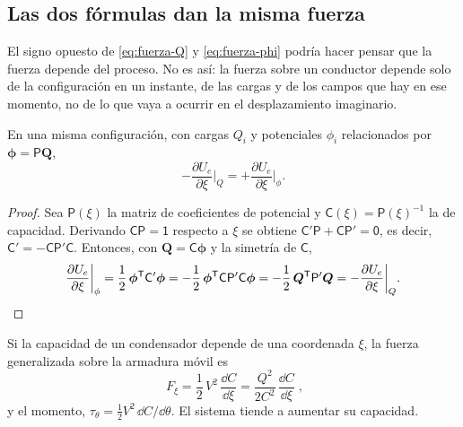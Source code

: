 \subsection{Las dos fórmulas dan la misma fuerza}

El signo opuesto de \eqref{eq:fuerza-Q} y \eqref{eq:fuerza-phi} podría hacer pensar que la fuerza depende del proceso. No es así: la fuerza sobre un
conductor depende solo de la configuración en un instante, de las cargas y de los campos que hay en ese momento, no de lo que vaya a ocurrir en el
desplazamiento imaginario.

\begin{proposicion}\label{prop:equivalencia}
En una misma configuración, con cargas $Q_i$ y potenciales $\phi_i$ relacionados por $\boldsymbol\phi=\mathsf P\boldsymbol Q$,
\begin{equation}\label{eq:equivalencia}
  -\frac{\partial U_e}{\partial\xi}\bigg|_{Q}=+\frac{\partial U_e}{\partial\xi}\bigg|_{\phi} .
\end{equation}
\end{proposicion}

\begin{proof}
Sea $\mathsf P(\xi)$ la matriz de coeficientes de potencial y $\mathsf C(\xi)=\mathsf P(\xi)^{-1}$ la de capacidad. Derivando $\mathsf C\mathsf P=\mathsf 1$ respecto a $\xi$ se obtiene
$\mathsf C'\mathsf P+\mathsf C\mathsf P'=\mathsf 0$, es decir, $\mathsf C'=-\mathsf C\mathsf P'\mathsf C$. Entonces, con $\boldsymbol Q=\mathsf C\boldsymbol\phi$ y la simetría de $\mathsf C$,
\[
  \frac{\partial U_e}{\partial\xi}\bigg|_{\phi}=\frac12\,\boldsymbol\phi^{\mathsf T}\mathsf C'\boldsymbol\phi=-\frac12\,\boldsymbol\phi^{\mathsf T}\mathsf C\mathsf P'\mathsf C\boldsymbol\phi
  =-\frac12\,\boldsymbol Q^{\mathsf T}\mathsf P'\boldsymbol Q=-\frac{\partial U_e}{\partial\xi}\bigg|_{Q}. \qedhere
\]
\end{proof}

\begin{corolario}\label{cor:fuerza-condensador}
Si la capacidad de un condensador depende de una coordenada $\xi$, la fuerza generalizada sobre la armadura móvil es
\begin{equation}\label{eq:fuerza-C}
  \boxed{\;F_\xi=\frac12\,V^2\,\frac{\dd C}{\dd\xi}=\frac{Q^2}{2C^2}\,\frac{\dd C}{\dd\xi}\;},
\end{equation}
y el momento, $\tau_\theta=\frac12V^2\,\dd C/\dd\theta$. El sistema tiende a aumentar su capacidad.
\end{corolario}

